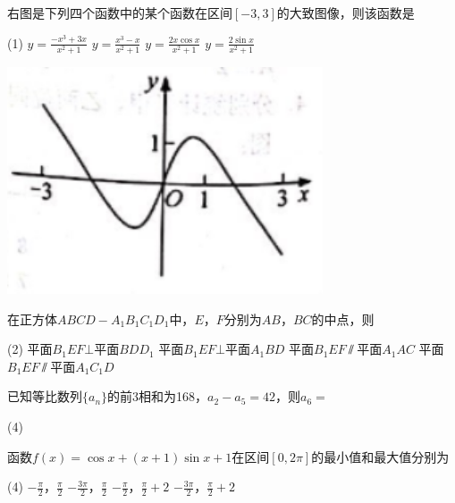 \documentclass[12pt,space]{ctexart} %
\begin{document}
\begin{enumerate}[itemsep=0.2em,topsep=0pt]
  \begin{minipage}[h][24ex][t]{.70\textwidth}
    \item 右图是下列四个函数中的某个函数在区间$[-3,3]$的大致图像，则该函数是
    \begin{tasks}(1)
      \task  $y=\displaystyle{\frac{-x^{3}+3x}{x^{2}+1}}$
      \task  $y=\displaystyle{\frac{x^{3}-x}{x^{2}+1}}$
      \task  $y=\displaystyle{\frac{2x\cos x}{x^{2}+1}}$
      \task  $y=\displaystyle{\frac{2\sin x}{x^{2}+1}}$
    \end{tasks}
  \end{minipage}
  \begin{minipage}[h][24ex][t]{.30\textwidth}
    \flushright
    \vspace{3em}
    \includegraphics[width=0.7\textwidth]{Image/ii-w-8.png}
    \hspace{2em}
  \end{minipage}

  \item 在正方体$ABCD-A_1B_1C_1D_1$中，$E$，$F$分别为$AB$，$BC$的中点，则
  \begin{tasks}(2)
    \task 平面$B_1EF\bot $平面$BDD_1$
    \task 平面$B_1EF\bot $平面$A_1BD$
    \task 平面$B_1EF\varparallel$平面$A_1AC$
    \task 平面$B_1EF\varparallel$平面$A_1C_1D$
  \end{tasks}

  \item 已知等比数列$\{a_n\}$的前3相和为168，$a_2-a_5=42$，则$a_6=$
  \begin{tasks}(4)
       
  \end{tasks}

  \item 函数$f(x)=\cos x+(x+1)\sin x+1$在区间$[0, 2\pi]$的最小值和最大值分别为
  \begin{tasks}(4)
    \task $\displaystyle{-\frac{\pi}{2}}$，$\displaystyle{\frac{\pi}{2}}$
    \task $\displaystyle{-\frac{3\pi}{2}}$，$\displaystyle{\frac{\pi}{2}}$
    \task $\displaystyle{-\frac{\pi}{2}}$，$\displaystyle{\frac{\pi}{2}+2}$
    \task $\displaystyle{-\frac{3\pi}{2}}$，$\displaystyle{\frac{\pi}{2}+2}$
  \end{tasks}

\end{enumerate}

\clearpage
\end{document}
